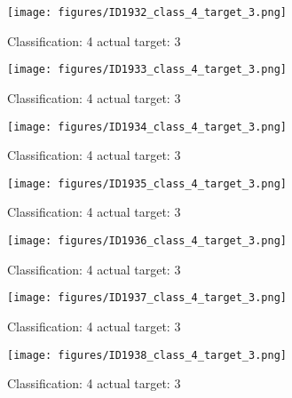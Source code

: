\begin{figure}[h!]
\begin{center}
\texttt{[image: figures/ID1932\_class\_4\_target\_3.png]}
\end{center}
\caption{ Classification: 4 actual target: 3}
\label{fig:ID1932_class_4_target_3}
\end{figure}
\begin{figure}[h!]
\begin{center}
\texttt{[image: figures/ID1933\_class\_4\_target\_3.png]}
\end{center}
\caption{ Classification: 4 actual target: 3}
\label{fig:ID1933_class_4_target_3}
\end{figure}
\begin{figure}[h!]
\begin{center}
\texttt{[image: figures/ID1934\_class\_4\_target\_3.png]}
\end{center}
\caption{ Classification: 4 actual target: 3}
\label{fig:ID1934_class_4_target_3}
\end{figure}
\begin{figure}[h!]
\begin{center}
\texttt{[image: figures/ID1935\_class\_4\_target\_3.png]}
\end{center}
\caption{ Classification: 4 actual target: 3}
\label{fig:ID1935_class_4_target_3}
\end{figure}
\begin{figure}[h!]
\begin{center}
\texttt{[image: figures/ID1936\_class\_4\_target\_3.png]}
\end{center}
\caption{ Classification: 4 actual target: 3}
\label{fig:ID1936_class_4_target_3}
\end{figure}
\begin{figure}[h!]
\begin{center}
\texttt{[image: figures/ID1937\_class\_4\_target\_3.png]}
\end{center}
\caption{ Classification: 4 actual target: 3}
\label{fig:ID1937_class_4_target_3}
\end{figure}
\begin{figure}[h!]
\begin{center}
\texttt{[image: figures/ID1938\_class\_4\_target\_3.png]}
\end{center}
\caption{ Classification: 4 actual target: 3}
\label{fig:ID1938_class_4_target_3}
\end{figure}
